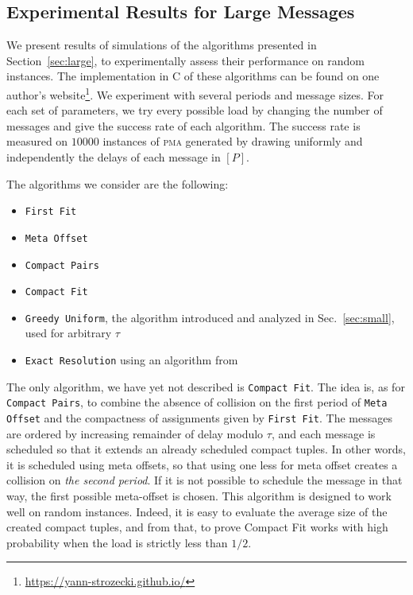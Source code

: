 \documentclass[a4paper,cleveref, autoref, thm-restate,UKenglish]{lipics-v2019}
\newcommand\pma{\textsc{pma}\xspace}
\newcommand\firstfit{\texttt{First Fit}\xspace}
\newcommand\compactpair{\texttt{Compact Pairs}\xspace}
\newcommand\metaoffset{\texttt{Meta Offset}\xspace}
\newcommand\greedyuniform{\texttt{Greedy Uniform}\xspace}
\newcommand\compactfit{\texttt{Compact Fit}\xspace}
\begin{document}
\subsection{Experimental Results for Large Messages} \label{sec:perf_large}

We present results of simulations of the algorithms presented in Section~\ref{sec:large}, to experimentally assess their performance on random instances. The implementation in C of these algorithms can be found on one author's website\footnote{\url{https://yann-strozecki.github.io/}}. We experiment with several periods and message sizes. For each set of parameters, we try every possible load by changing the number of messages and give the success rate of each algorithm. The success rate is measured on $10000$ instances of \pma generated by drawing uniformly and independently the delays of each message in $[P]$. 

The algorithms we consider are the following:
\begin{itemize}
  \item \firstfit
  \item \metaoffset
  \item \compactpair
  \item \compactfit
  \item \greedyuniform, the algorithm introduced and analyzed in Sec.~\ref{sec:small}, used for arbitrary $\tau$
  \item \texttt{Exact Resolution} using an algorithm from~\cite{dominique2018deterministic}  
\end{itemize}

The only algorithm, we have yet not described is \compactfit. The idea is, as for \compactpair, to combine 
the absence of collision on the first period of \metaoffset and the compactness of assignments given by \firstfit.
The messages are ordered by increasing remainder of delay modulo $\tau$, and each message is scheduled so that 
it extends an already scheduled compact tuples. In other words, it is scheduled using meta offsets, so that using one less for meta offset creates a collision on \emph{the second period}. If it is not possible to schedule the message in that way, the first possible meta-offset is chosen. This algorithm is designed to work well on random instances. Indeed, it 
is easy to evaluate the average size of the created compact tuples, and from that, to prove Compact Fit works with high probability when the load is strictly less than $1/2$.
\end{document}
